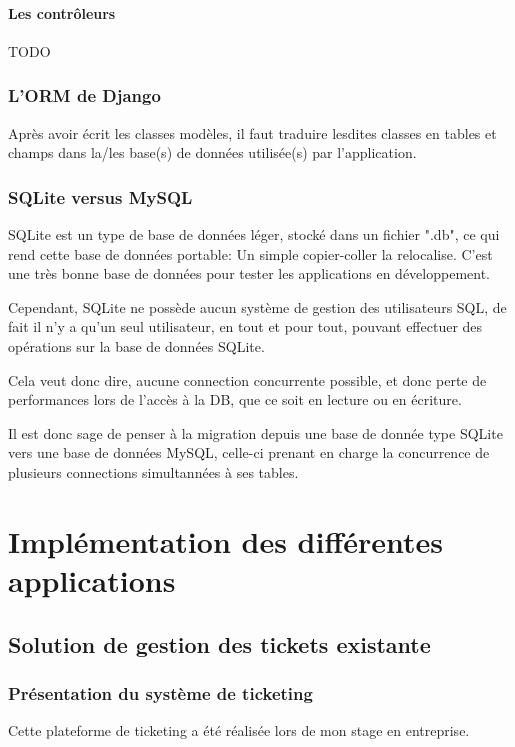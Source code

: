 \documentclass[12pt,table,a4paper]{report}
\begin{document}
\subsubsection{Les contrôleurs}
TODO

\subsection{L'ORM de Django}
Après avoir écrit les classes modèles, il faut traduire lesdites classes en tables et champs dans la/les base(s) de données utilisée(s) par l'application.

\subsection{SQLite versus MySQL}
SQLite est un type de base de données léger, stocké dans un fichier ".db", ce qui rend cette base de données portable: Un simple copier-coller la relocalise. C'est une très bonne base de données pour tester les applications en développement.

Cependant, SQLite ne possède aucun système de gestion des utilisateurs SQL, de fait il n'y a qu'un seul utilisateur, en tout et pour tout, pouvant effectuer des opérations sur la base de données SQLite.

Cela veut donc dire, aucune connection concurrente possible, et donc perte de performances lors de l'accès à la DB, que ce soit en lecture ou en écriture.

Il est donc sage de penser à la migration depuis une base de donnée type SQLite vers une base de données MySQL, celle-ci prenant en charge la concurrence de plusieurs connections simultannées à ses tables.


\chapter{Implémentation des différentes applications}

\section{Solution de gestion des tickets existante}

\subsection{Présentation du système de ticketing}
Cette plateforme de ticketing a été réalisée lors de mon stage en entreprise.
\end{document}
